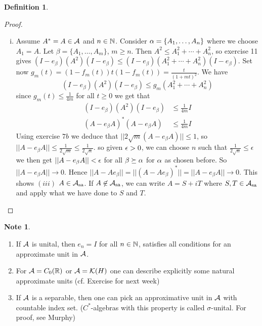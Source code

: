 \documentclass[10pt,english,a4paper]{article}
\theoremstyle{definition}
\newtheorem*{definition}{Definition}
\newtheorem*{note}{Note}
\def\Assa{\As_{\text{sa}}}
\begin{document}
\begin{definition}
\begin{proof}
\begin{enumerate}[(i)]
\item 
Assume $A^* = A \in \mathcal{A}$ and $n \in \mathbb{N}$.
Consider $\alpha = \{A_1, \ldots, A_n\}$ where we choose $A_1 = A$.
Let  $\beta = \{A_1, \ldots, A_m\}$, $m \geq n$. Then 
$A^2 \leq A_{1}^{2} + \cdots + A_{n}^{2}$, so 
exercise 11 gives 
$(I - e_{\beta} )(A^2) (I -e_{\beta})\leq (I -e_{\beta})(A_{1}^{2} + \cdots +
A_{n}^{2})(I -e_{\beta})$. Set now 
$g_m(t) = (1-f_m(t))t (1-f_m(t)) = \frac{t}{(1+mt)^2}$.
We have 
\[ (I - e_{\beta} )(A^2) (I -e_{\beta})\leq 
g_m(A_{1}^{2} + \cdots + A_{n}^{2})
\]
since $g_m(t) \leq \frac{1}{4m}$ for all $t \geq 0$ we get that
\begin{align*}
    (I - e_{\beta} )(A^2) (I -e_{\beta}) &\leq \frac{1}{4m} I \\
    (A-e_{\beta}A)^* (A - e_{\beta}A) &\leq \frac{1}{4m} I
\end{align*}
Using exercise $7b$ we deduce that 
$||2\sqrt{m} (A -e_{\beta}A)|| \leq 1$, so $||A-e_{\beta}A|| \leq
\frac{1}{2\sqrt{m}} \leq \frac{1}{2\sqrt{n}}$.
so given $\epsilon > 0$, we can choose $n$ such that $\tfrac{1}{2\sqrt{n}} \leq \epsilon$
we then get $||A-e_{\beta}A||< \epsilon$ for all $\beta \succeq \alpha$ for $\alpha$ as 
chosen before. So $||A-e_{\beta}A || \to 0$. Hence 
$||A-Ae_{\beta}|| = ||(A - Ae_{\beta})^*|| = ||A-e_{\beta}A|| \to 0$.
This shows $(iii)$ $A \in \Assa$. If $A \not\in \Assa$, we can write 
$A = S + iT$ where $S,T \in \Assa$ and apply what we have done to $S$ and $T$.

\end{enumerate}

\end{proof}


\begin{note}
\begin{enumerate}[(1)]
    \item If $\mathcal{A}$ is unital, then $e_{n}  =I$ for all $n \in \mathbb{N}$, satisfies 
all conditions for an approximate unit in $\mathcal{A}$.

\item For $\mathcal{A} = C_{0}(\mathbb{R})$ or $\mathcal{A} = \mathcal{K}(H)$ one can describe 
explicitly some natural approximate units (cf. Exercise for next week)

\item If $\mathcal{A}$ is a separable, then one can pick an approximative unit in 
$\mathcal{A}$ with countable index set. 
($C^*$-algebras with this property is called $\sigma$-unital. For proof, see 
Murphy)

\end{enumerate}    

\end{note}

\end{definition}
\end{document}
